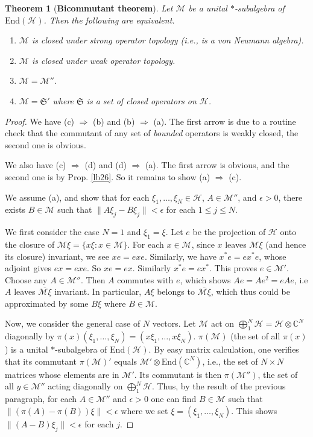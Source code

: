 \documentclass[12pt,b5paper,notitlepage]{article}
\theoremstyle{definition}
\theoremstyle{plain}
\newtheorem{thm}[df]{Theorem}
\newcommand{\fk}{\mathfrak}
\newcommand{\mc}{\mathcal}
\newcommand{\ovl}{\overline}
\newcommand{\End}{\mathrm{End}} %
\newcommand{\Cbb}{\mathbb C}
\numberwithin{equation}{section}
\begin{document}
\begin{thm}[\textbf{Bicommutant theorem}]\label{lb59}
Let $\mc M$ be a unital $*$-subalgebra of $\End(\mc H)$. Then the following  are equivalent.
\begin{enumerate}[label=(\alph*)]
\item $\mc M$ is closed under strong operator topology (i.e., is a von Neumann algebra).
\item $\mc M$ is closed under weak operator topology. 
\item $\mc M=\mc M''$.
\item $\mc M=\fk S'$ where $\fk S$ is a set of closed operators on $\mc H$.
\end{enumerate}	



\end{thm}	

\begin{proof}
	We have (c) $\Rightarrow$ (b)  and (b) $\Rightarrow$ (a). The first arrow is due to a routine check that the commutant of any set of \textit{bounded} operators is weakly closed, the second one is obvious.
	
	We also have (c) $\Rightarrow$ (d)  and (d) $\Rightarrow$ (a). The first arrow is obvious, and the second one is by Prop. \ref{lb26}. So it remains to show (a) $\Rightarrow$ (c).
	
	
	
	We assume (a), and  show that for each $\xi_1,\dots,\xi_N\in\mc H$, $A\in\mc M''$, and $\epsilon>0$, there exists $B\in\mc M$ such that $\lVert A\xi_j-B\xi_j\lVert<\epsilon$ for each $1\leq j\leq N$.
	
	We first consider the case $N=1$ and $\xi_1=\xi$. Let $e$ be the projection of $\mc H$ onto the closure of $\mc M\xi=\{x\xi:x\in\mc M\}$. For each $x\in\mc M$, since $x$ leaves $\mc M\xi$ (and hence its closure) invariant, we see $xe=exe$. Similarly, we have $x^*e=ex^*e$, whose adjoint gives $ex=exe$. So $xe=ex$. Similarly $x^*e=ex^*$. This proves $e\in\mc M'$. Choose any $A\in\mc M''$. Then $A$ commutes with $e$, which shows $Ae=Ae^2=eAe$, i.e $A$ leaves $\ovl{\mc M\xi}$ invariant. In particular, $A\xi$ belongs to $\ovl{\mc M\xi}$, which thus could be approximated by some $B\xi$ where $B\in\mc M$.
	
	Now, we consider the general case of $N$ vectors. Let $\mc M$ act on $\bigoplus_1^N\mc H=\mc H\otimes\Cbb^N$ diagonally by $\pi(x)(\xi_1,\dots,\xi_N)=(x\xi_1,\dots,x\xi_N)$. $\pi(\mc M)$ (the set of all $\pi(x)$) is a unital $*$-subalgebra of $\End(\mc H)$. By easy matrix calculation, one verifies that its commutant $\pi(\mc M)'$ equals $\mc M'\otimes\End(\Cbb^N)$, i.e., the set of $N\times N$ matrices whose elements are in $\mc M'$. Its commutant is then $\pi(\mc M'')$, the set of all $y\in\mc M''$ acting diagonally on $\bigoplus_1^N\mc H$. Thus, by the result of the previous paragraph, for each $A\in\mc M''$ and $\epsilon>0$ one can find $B\in\mc M$ such that $\lVert (\pi(A)-\pi(B))\xi\lVert<\epsilon$ where we set $\xi=(\xi_1,\dots,\xi_N)$. This shows $\lVert (A-B)\xi_j\lVert<\epsilon$ for each $j$.
\end{proof}
\end{document}
